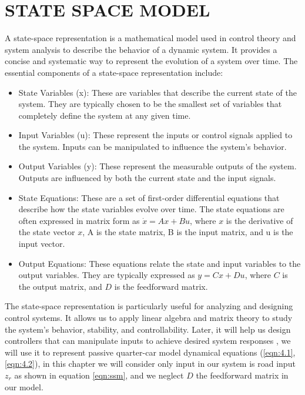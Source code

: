 
\section{STATE SPACE MODEL}
A state-space representation is a mathematical model used in control theory and system analysis to describe the behavior of a dynamic system. It provides a concise and systematic way to represent the evolution of a system over time. The essential components of a state-space representation include:

\begin{itemize}
	\item State Variables (x): These are variables that describe the current state of the system. They are typically chosen to be the smallest set of variables that completely define the system at any given time.
	\item Input Variables (u): These represent the inputs or control signals applied to the system. Inputs can be manipulated to influence the system's behavior.
	\item Output Variables (y): These represent the measurable outputs of the system. Outputs are influenced by both the current state and the input signals.
	\item State Equations: These are a set of first-order differential equations that describe how the state variables evolve over time. The state equations are often expressed in matrix form as $\dot{x}=Ax+Bu$, where $x$ is the derivative of the state vector $x$, A is the state matrix, B is the input matrix, and u is the input vector.
	\item Output Equations: These equations relate the state and input variables to the output variables. They are typically expressed as $y=Cx+Du$, where $C$ is the output matrix, and $D$ is the feedforward matrix.
\end{itemize}

The state-space representation is particularly useful for analyzing and designing control systems. It allows us to apply linear algebra and matrix theory to study the system's behavior, stability, and controllability. Later, it will help us design controllers that can manipulate inputs to achieve desired system responses \cite{nguyen2023dynamic}, we will use it to represent passive quarter-car model dynamical equations (\ref{eqn:4.1}, \ref{eqn:4.2}), in this chapter we will consider only input in our system is road input $z_r$ as shown in equation \ref{eqn:ssm}, and we neglect $D$  the feedforward matrix in our model.

